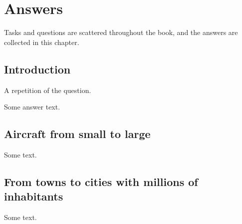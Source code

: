 \setchapterpreamble[u]{\margintoc}
\chapter{Answers}

Tasks and questions are scattered throughout the book, 
and the answers are collected in this chapter.


\section{Introduction}


\begin{exercise}
A repetition of the question.
\end{exercise}

Some answer text.



\section{Aircraft from small to large}

Some text.

\section{From towns to cities with millions of inhabitants}

Some text.


